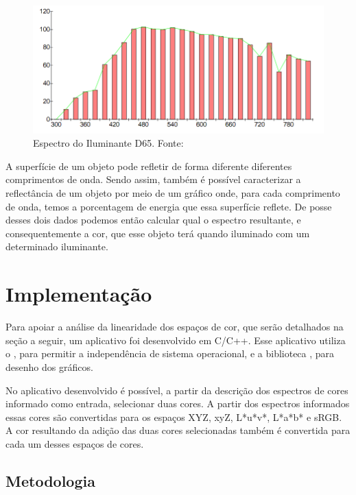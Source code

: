 \documentclass[a4paper,10pt]{report}
\begin{document}
\begin{figure}[!htb]
     \centering
     \includegraphics[scale=0.8]{img/illuminant_d65.png}
     \caption{Espectro do Iluminante D65. Fonte:
}
     \label{fig:illuminant_d65}
\end{figure}

\par
A superfície de um objeto pode refletir de forma diferente diferentes
comprimentos de onda. Sendo assim, também é possível caracterizar a
reflectância de um objeto por meio de um gráfico onde, para cada comprimento de
onda, temos a porcentagem de energia que essa superfície reflete. De posse
desses dois dados podemos então calcular qual o espectro resultante, e
consequentemente a cor, que esse objeto terá quando iluminado com um
determinado iluminante.

\section{Implementação}
Para apoiar a análise da linearidade dos espaços de cor, que serão detalhados
na seção a seguir, um aplicativo foi desenvolvido em C/C++. Esse aplicativo
utiliza o , para permitir a
independência de
sistema operacional, e a biblioteca
, para desenho dos
gráficos.

\par
No aplicativo desenvolvido é possível, a partir da descrição dos espectros de
cores informado como entrada, selecionar duas cores. A partir dos espectros
informados essas cores são convertidas para os espaços XYZ, xyZ, L*u*v*,
L*a*b* e sRGB. A cor resultando da adição das duas cores selecionadas também é
convertida para cada um desses espaços de cores.

\subsection{Metodologia}
\end{document}
